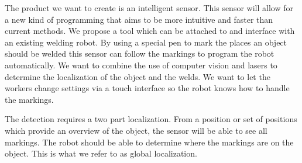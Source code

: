 
The product we want to create is an intelligent sensor.
This sensor will allow for a new kind of programming that aims to be more intuitive and faster than current methods.
We propose a tool which can be attached to and interface with an existing welding robot. 
By using a special pen to mark the places an object should be welded this sensor can follow the markings to program the robot automatically.
We want to combine the use of computer vision and lasers to determine the localization of the object and the welds.
We want to let the workers change settings via a touch interface so the robot knows how to handle the markings. 

The detection requires a two part localization. 
From a position or set of positions which provide an overview of the object, the sensor will be able to see all markings.
The robot should be able to determine where the markings are on the object. 
This is what we refer to as global localization.


